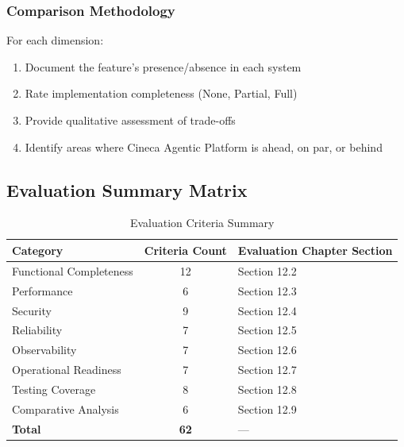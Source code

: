 \subsubsection{Comparison Methodology}

For each dimension:
\begin{enumerate}
    \item Document the feature's presence/absence in each system
    \item Rate implementation completeness (None, Partial, Full)
    \item Provide qualitative assessment of trade-offs
    \item Identify areas where Cineca Agentic Platform is ahead, on par, or behind
\end{enumerate}

\subsection{Evaluation Summary Matrix}
\label{subsec:eval-summary}

\begin{table}[htbp]
\centering
\caption{Evaluation Criteria Summary}
\label{tab:eval-summary}
\small
\begin{tabular}{|l|c|l|}
\hline
\textbf{Category} & \textbf{Criteria Count} & \textbf{Evaluation Chapter Section} \\
\hline
Functional Completeness & 12 & Section 12.2 \\
\hline
Performance & 6 & Section 12.3 \\
\hline
Security & 9 & Section 12.4 \\
\hline
Reliability & 7 & Section 12.5 \\
\hline
Observability & 7 & Section 12.6 \\
\hline
Operational Readiness & 7 & Section 12.7 \\
\hline
Testing Coverage & 8 & Section 12.8 \\
\hline
Comparative Analysis & 6 & Section 12.9 \\
\hline
\textbf{Total} & \textbf{62} & --- \\
\hline
\end{tabular}
\end{table}

